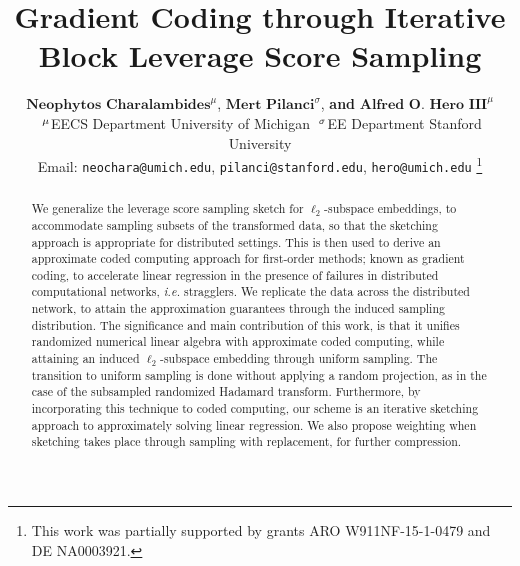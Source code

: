 \documentclass[journal,letterpaper,onecolumn,twoside,nofonttune]{IEEEtran}
\newcommand{\white}{\color{white}}
\begin{document}
\title{Gradient Coding through Iterative Block Leverage Score Sampling}

\author{$\textbf{Neophytos Charalambides}^{\mu}$, $\textbf{Mert Pilanci}^{\sigma}$, \textbf{and} $\textbf{Alfred O. Hero III}^{\mu}$\\
$\text{\white.}^{\mu}$EECS Department University of Michigan $\text{\white.}^{\sigma}$EE Department Stanford University\\
  Email: \texttt{neochara@umich.edu}, \texttt{pilanci@stanford.edu}, \texttt{hero@umich.edu}
\thanks{This work was partially supported by grants ARO W911NF-15-1-0479 and DE NA0003921.}%
\vspace{-4mm}
}

\maketitle

\begin{abstract}
We generalize the leverage score sampling sketch for $\ell_2$-subspace embeddings, to accommodate sampling subsets of the transformed data, so that the sketching approach is appropriate for distributed settings. This is then used to derive an approximate coded computing approach for first-order methods; known as gradient coding, to accelerate linear regression in the presence of failures in distributed computational networks, \textit{i.e.} stragglers. We replicate the data across the distributed network, to attain the approximation guarantees through the induced sampling distribution. The significance and main contribution of this work, is that it unifies randomized numerical linear algebra with approximate coded computing, while attaining an induced $\ell_2$-subspace embedding through uniform sampling. The transition to uniform sampling is done without applying a random projection, as in the case of the subsampled randomized Hadamard transform. Furthermore, by incorporating this technique to coded computing, our scheme is an iterative sketching approach to approximately solving linear regression. We also propose weighting when sketching takes place through sampling with replacement, for further compression.%
\end{abstract}
\vspace{3mm}
\end{document}
